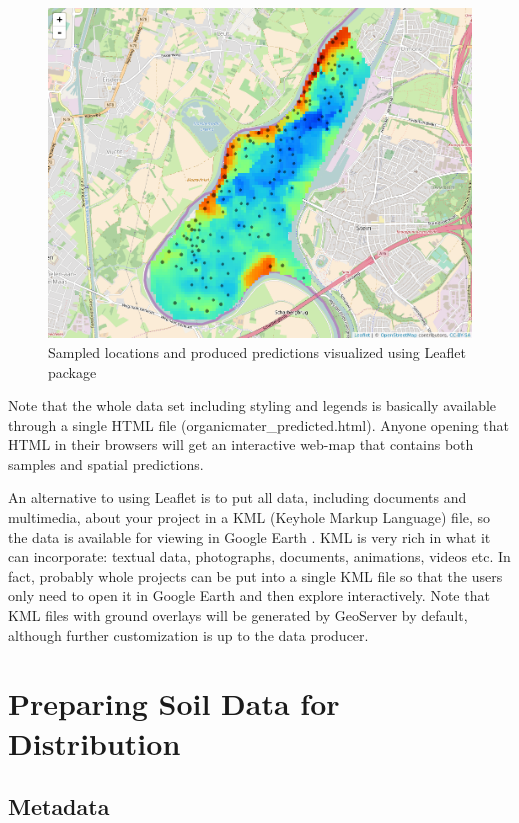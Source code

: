 \documentclass[10pt,b5paper,]{book}
\theoremstyle{definition}
\theoremstyle{definition}
\theoremstyle{definition}
\theoremstyle{remark}
\begin{document}
\begin{figure}
\centering
\includegraphics{images/Data_sharing_Leaflet.png}
\caption{Sampled locations and produced predictions visualized using
Leaflet package}
\end{figure}

Note that the whole data set including styling and legends is basically
available through a single HTML file (organicmater\_predicted.html).
Anyone opening that HTML in their browsers will get an interactive
web-map that contains both samples and spatial predictions.

An alternative to using Leaflet is to put all data, including documents
and multimedia, about your project in a KML (Keyhole Markup Language)
file, so the data is available for viewing in Google Earth
\citep{hengl2015plotkml}. KML is very rich in what it can incorporate:
textual data, photographs, documents, animations, videos etc. In fact,
probably whole projects can be put into a single KML file so that the
users only need to open it in Google Earth and then explore
interactively. Note that KML files with ground overlays will be
generated by GeoServer by default, although further customization is up
to the data producer.

\hypertarget{preparing-soil-data-for-distribution}{%
\section{Preparing Soil Data for
Distribution}\label{preparing-soil-data-for-distribution}}

\hypertarget{metadata}{%
\subsection{Metadata}\label{metadata}}
\end{document}
